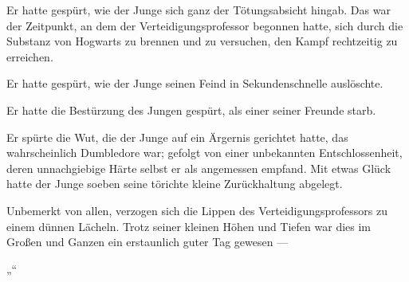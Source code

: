 Er hatte gespürt, wie der Junge sich ganz der Tötungsabsicht hingab. Das war der Zeitpunkt, an dem der Verteidigungsprofessor begonnen hatte, sich durch die Substanz von Hogwarts zu brennen und zu versuchen, den Kampf rechtzeitig zu erreichen.

Er hatte gespürt, wie der Junge seinen Feind in Sekundenschnelle auslöschte.

Er hatte die Bestürzung des Jungen gespürt, als einer seiner Freunde starb.

Er spürte die Wut, die der Junge auf ein Ärgernis gerichtet hatte, das wahrscheinlich Dumbledore war; gefolgt von einer unbekannten Entschlossenheit, deren unnachgiebige Härte selbst er als angemessen empfand. Mit etwas Glück hatte der Junge soeben seine törichte kleine Zurückhaltung abgelegt.

Unbemerkt von allen, verzogen sich die Lippen des Verteidigungsprofessors zu einem dünnen Lächeln. Trotz seiner kleinen Höhen und Tiefen war dies im Großen und Ganzen ein erstaunlich guter Tag gewesen —

„“

